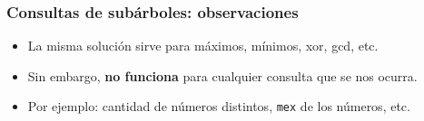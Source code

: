 \begin{frame}
  \frametitle{Consultas de subárboles: observaciones}

  \begin{itemize}
    \item La misma solución sirve para máximos, mínimos, xor, gcd, etc.
    \item Sin embargo, \textbf{no funciona} para cualquier consulta que se nos ocurra.
    \item Por ejemplo: cantidad de números distintos, \texttt{mex} de los números, etc.
  \end{itemize}
\end{frame}

